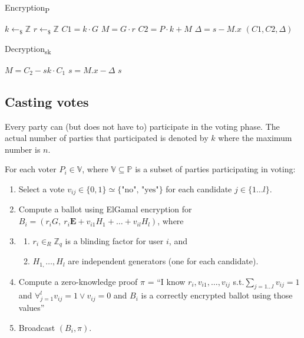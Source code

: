 \documentclass{article}
\begin{document}
\begin{algorithm}
    \caption{Encryption\textsubscript{P}}
    
    
    $k \gets_\$ \mathbb{Z}$\;
    $r \gets_\$ \mathbb{Z}$\;
    $C1 = k \cdot G$\;
    $M = G \cdot r$\;
    $C2 = P \cdot k + M$\;
    $\Delta = s - M.x$\;
    \Return $(C1, C2, \Delta)$\;
\end{algorithm}

\begin{algorithm}
    \caption{Decryption\textsubscript{sk}}
    
    
    $M = C_2 - sk \cdot C_1$\;
    $s = M.x - \Delta$\;
    \Return $s$\;
\end{algorithm}



\subsection{Casting votes}

Every party can (but does not have to) participate in the voting phase. The actual number of parties that participated is denoted by $k$ where the maximum number is $n$.

For each voter $P_i \in \mathbb{V}$, where $\mathbb{V} \subseteq  \mathbb{P}$ is a subset of parties participating in voting:

\begin{enumerate}
    \item Select a vote $v_{ij} \in \{0,1\} \simeq \{\textrm{"no", "yes"}\}$ for each candidate $j \in \{1 \dots l\}$.
    \item Compute a ballot using ElGamal encryption for $B_i = (r_i G,\ r_i \mathbf{E} + v_{i1} H_1 + \dots + v_{il} H_l)$, where 
    \item \begin{enumerate}
        \item $r_{i} \in_{R} \mathbb{Z}_q$ is a blinding factor for user $i$, and 
        \item $H_{1,}\dots, H_{l}$ are independent generators (one for each candidate).
    \end{enumerate}
    \item Compute a zero-knowledge proof $\pi$ = “I know $r_i, v_{i1},\dots,v_{ij}$ s.t.$\sum_{j= 1 \dots l}v_{ij}=1$ and $\forall_{j=1}^{l}v_{ij}=1 \lor v_{ij}=0$ and $B_i$ is a correctly encrypted ballot using those values”
    \item Broadcast $(B_i,\pi)$.
\end{enumerate}
\end{document}
